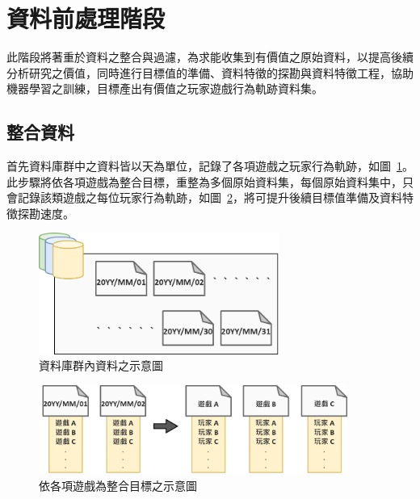\section{資料前處理階段}

此階段將著重於資料之整合與過濾，為求能收集到有價值之原始資料，以提高後續分析研究之價值，同時進行目標值的準備、資料特徵的探勘與資料特徵工程，協助機器學習之訓練，目標產出有價值之玩家遊戲行為軌跡資料集。

\subsection{整合資料}

首先資料庫群中之資料皆以天為單位，記錄了各項遊戲之玩家行為軌跡，如圖~\ref{fig:Image_Databases}。此步驟將依各項遊戲為整合目標，重整為多個原始資料集，每個原始資料集中，只會記錄該類遊戲之每位玩家行為軌跡，如圖~\ref{fig:Image_Integration}，將可提升後續目標值準備及資料特徵探勘速度。

\begin{figure}[!htb]
  \begin{center}
    \includegraphics[width=0.7\textwidth]{figures/Image_Databases.png}
    \caption[資料庫群內資料之示意圖]{資料庫群內資料之示意圖}
    \label{fig:Image_Databases}
  \end{center}
\end{figure}

\begin{figure}[!htb]
  \begin{center}
    \includegraphics[width=0.9\textwidth]{figures/Image_Integration.png}
    \caption[依各項遊戲為整合目標之示意圖]{依各項遊戲為整合目標之示意圖}
    \label{fig:Image_Integration}
  \end{center}
\end{figure}

